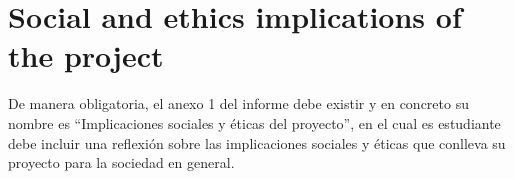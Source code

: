 \chapter{Social and ethics implications of the project}

De manera obligatoria, el anexo 1 del informe debe existir y en concreto
su nombre es “Implicaciones sociales y éticas del proyecto”, en el cual es
estudiante debe incluir una reflexión sobre las implicaciones sociales y
éticas que conlleva su proyecto para la sociedad en general.